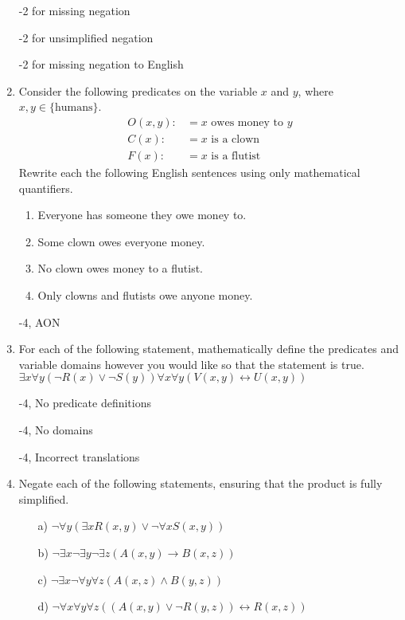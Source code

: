 \begin{enumerate}
\begin{rubric}
    -2 for missing negation
    
    -2 for unsimplified negation
    
    -2 for missing negation to English
    \end{rubric}
    
    \item Consider the following predicates on the variable $x$ and $y$, where $x,y \in \{\text{humans}\}$.
    \begin{align*}
        O(x,y) :&= \text{$x$ owes money to $y$}\\
        C(x) :&= \text{$x$ is a clown}\\
        F(x) :&= \text{$x$ is a flutist}
    \end{align*}
    Rewrite each the following English sentences using only mathematical quantifiers. 
    \begin{enumerate}
        \item Everyone has someone they owe money to.
        \item Some clown owes everyone money.
        \item No clown owes money to a flutist.
        \item Only clowns and flutists owe anyone money.
    \end{enumerate}
    
    \begin{rubric}
    -4, AON
    \end{rubric}
    
    \item For each of the following statement, mathematically define the predicates and variable domains however you would like so that the statement is true.  \\

    $\exists x \forall y (\neg R(x) \lor \neg S(y))$$\forall x \forall y (V(x,y) \longleftrightarrow U(x,y))$
    
    \begin{rubric}
    -4, No predicate definitions
    
    -4, No domains
    
    -4, Incorrect translations
    \end{rubric}
    
    \item Negate each of the following statements, ensuring that the product is fully simplified. 
    
    \begin{enumerate}
        \item[a)] $\neg  \forall y (\exists x R(x,y) \lor \neg \forall x S(x,y))$
        \item[b)] $\neg  \exists x \neg \exists y \neg \exists z (A(x,y) \rightarrow B(x,z))$ 
        \item[c)] $\neg  \exists x \neg \forall y \forall z (A(x,z) \land B(y,z))$
        \item[d)] $\neg \forall x \forall y \forall z ((A(x,y) \lor \neg R(y,z)) \longleftrightarrow R(x,z))$
    \end{enumerate}
    

\end{enumerate}
